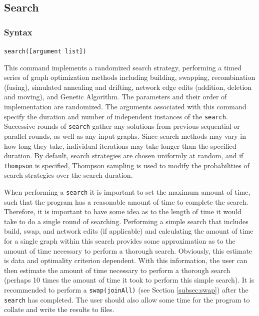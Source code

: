 \subsection{Search}
\label{subsec:search}
	\subsubsection{Syntax}
		\texttt{search([argument list])}
	
	\begin{phygdescription}
		{This command implements a randomized search strategy, performing a timed 
		 series of graph optimization methods including building, swapping, 
		recombination (fusing), simulated annealing and drifting, network edge edits
		(addition, deletion and moving), and Genetic Algorithm. The parameters and 
		their order of implementation are randomized. The arguments 
		associated with this command specify the duration and number of independent 
		instances of the \texttt{search}. Successive rounds of \texttt{search} gather any 
		solutions from previous sequential or parallel rounds, as well as any input graphs. 
		Since search methods may vary in how long they take, individual iterations may 
		take longer than the specified duration.  By default, search strategies are chosen 
		uniformly at random, and if \texttt{Thompson} is specified, Thompson sampling 
		\cite{Thompson1933,WheelerThompson} is used to modify the probabilities 
		of search strategies over the search duration.
		
		When performing a \texttt{search} it is important to set the maximum amount of time, 
		such that the program has a reasonable amount of time to complete the search. 
		Therefore, it is important to have some idea as to the length of time it would take 
		to do a single round of searching. Performing a simple search that includes 
		build, swap, and network edits (if applicable) and calculating the amount of time 
		for a single graph within this search provides some approximation as to the amount 
		of time necessary to perform a thorough search. Obviously, this estimate is data and 
		optimality criterion dependent. With this information, the user can then estimate the 
		amount of time necessary to perform a thorough search (perhaps 10 times the 
		amount of time it took to perform this simple search). It is recommended to perform 
		a \texttt{swap(joinAll)} (see Section \ref{subsec:swap}) after the \texttt{search} has 
		completed. The user should also allow some time for the program to collate and 
		write the results to files.}
	\end{phygdescription}
			
